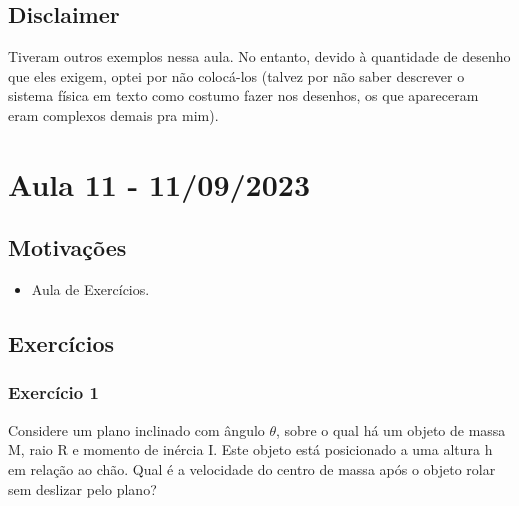 \documentclass{article}
\begin{document}
\subsection{Disclaimer}
  Tiveram outros exemplos nessa aula. No entanto, devido à quantidade de desenho que eles exigem, optei por não colocá-los (talvez por não saber
descrever o sistema física em texto como costumo fazer nos desenhos, os que apareceram eram complexos demais pra mim).
\newpage

\section{Aula 11 - 11/09/2023}
\subsection{Motivações}
\begin{itemize}
  \item Aula de Exercícios.
\end{itemize}
\subsection{Exercícios}
\subsubsection{Exercício 1}
  Considere um plano inclinado com ângulo \(\theta \), sobre o qual há um objeto de massa M, raio R e momento de inércia I.
Este objeto está posicionado a uma altura h em relação ao chão. Qual é a velocidade do centro de massa após o objeto rolar sem deslizar pelo plano?
\end{document}
